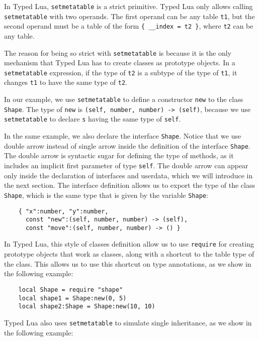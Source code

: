 In Typed Lua, \texttt{setmetatable} is a strict primitive.
Typed Lua only allows calling \texttt{setmetatable} with
two operands.
The first operand can be any table \texttt{t1}, but the second operand
must be a table of the form \texttt{\{ \string_\string_index = t2 \}},
where \texttt{t2} can be any table.

The reason for being so strict with \texttt{setmetatable} is because
it is the only mechanism that Typed Lua has to create classes
as prototype objects.
In a \texttt{setmetatable} expression, if the type of \texttt{t2}
is a subtype of the type of \texttt{t1}, it changes \texttt{t1} to
have the same type of \texttt{t2}.

In our example, we use \texttt{setmetatable} to define a constructor
\texttt{new} to the class \texttt{Shape}.
The type of \texttt{new} is \texttt{(self, number, number) -> (self)},
because we use \texttt{setmetatable} to declare \texttt{s} having
the same type of \texttt{self}.

In the same example, we also declare the interface \texttt{Shape}.
Notice that we use double arrow instead of single arrow inside the
definition of the interface \texttt{Shape}.
The double arrow is syntactic sugar for defining the type of methods,
as it includes an implicit first parameter of type \texttt{self}.
The double arrow can appear only inside the declaration of
interfaces and userdata, which we will introduce in the next section.
The interface definition allows us to export the type of the class \texttt{Shape},
which is the same type that is given by the variable \texttt{Shape}:
\begin{verbatim}
    { "x":number, "y":number,
      const "new":(self, number, number) -> (self),
      const "move":(self, number, number) -> () }
\end{verbatim}

In Typed Lua, this style of classes definition allow us to use \texttt{require}
for creating prototype objects that work as classes,
along with a shortcut to the table type of the class.
This allows us to use this shortcut on type annotations,
as we show in the following example:
\begin{verbatim}
    local Shape = require "shape"
    local shape1 = Shape:new(0, 5)
    local shape2:Shape = Shape:new(10, 10)
\end{verbatim}

Typed Lua also uses \texttt{setmetatable} to simulate single inheritance,
as we show in the following example:

